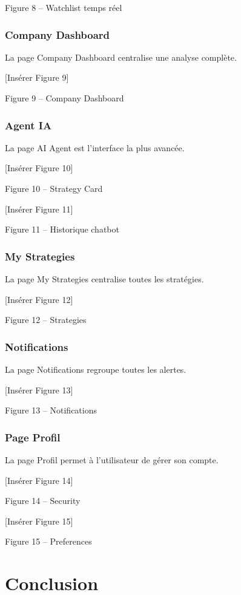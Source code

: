 Figure 8 – Watchlist temps réel

\subsubsection{Company Dashboard}

La page Company Dashboard centralise une analyse complète.

[Insérer Figure 9]

Figure 9 – Company Dashboard

\subsubsection{Agent IA}

La page AI Agent est l’interface la plus avancée.

[Insérer Figure 10]

Figure 10 – Strategy Card

[Insérer Figure 11]

Figure 11 – Historique chatbot

\subsubsection{My Strategies}

La page My Strategies centralise toutes les stratégies.

[Insérer Figure 12]

Figure 12 – Strategies

\subsubsection{Notifications}

La page Notifications regroupe toutes les alertes.

[Insérer Figure 13]

Figure 13 – Notifications

\subsubsection{Page Profil}

La page Profil permet à l’utilisateur de gérer son compte.

[Insérer Figure 14]

Figure 14 – Security

[Insérer Figure 15]

Figure 15 – Preferences

\section{Conclusion}

